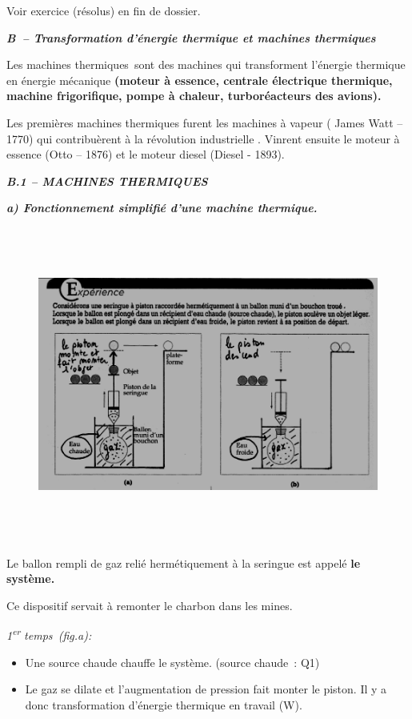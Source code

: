 Voir exercice (résolus) en fin de dossier.

\emph{\textbf{B~-- Transformation d'énergie thermique et machines
thermiques}}

Les machines thermiques~sont des machines qui transforment l'énergie
thermique en énergie mécanique \textbf{(moteur à essence, centrale
électrique thermique, machine frigorifique, pompe à chaleur,
turboréacteurs des avions). }

Les premières machines thermiques furent les machines à vapeur ( James
Watt -- 1770) qui contribuèrent à la révolution industrielle . Vinrent
ensuite le moteur à essence (Otto -- 1876) et le moteur diesel (Diesel -
1893).

\emph{\textbf{B.1 -- MACHINES THERMIQUES}}

\emph{\textbf{a) Fonctionnement simplifié d'une machine thermique. }}

\begin{figure}
\centering
\includegraphics[width=16.558cm,height=10.349cm]{Pictures/10000001000001DE0000012B86B99364138CE2C8.png}
\caption{}
\end{figure}

Le ballon rempli de gaz relié hermétiquement à la seringue est appelé
\textbf{le système.}

Ce dispositif servait à remonter le charbon dans les mines.

\emph{1}\textsuperscript{\emph{er}}\emph{ temps~(fig.a):}

\begin{itemize}
\tightlist
\item
  Une source chaude chauffe le système. (source chaude~: Q1)
\item
  Le gaz se dilate et l'augmentation de pression fait monter le piston.
  Il y a donc transformation d'énergie thermique en travail (W).
\end{itemize}

